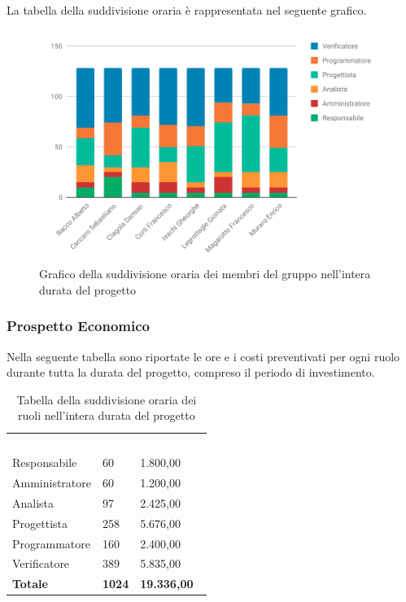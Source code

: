 La tabella della suddivisione oraria è rappresentata nel seguente grafico.
\begin{figure}[H]
\centering
	\includegraphics[width=.9\linewidth]{Preventivo/grafici/TI1.pdf}
	\caption{Grafico della suddivisione oraria dei membri del gruppo nell'intera durata del progetto}
\end{figure}

\subsubsection{Prospetto Economico}
Nella seguente tabella sono riportate le ore e i costi preventivati per ogni ruolo durante tutta la durata del progetto, compreso il periodo di investimento.


\begin{table}[H]	
	\begin{center}
	    \begin{tabular}{C{4cm}C{1cm}C{3,5cm}}
			\textcolor{white}{\textbf{Ruolo}} & \textcolor{white}{\textbf{Ore}} & \textcolor{white}{\textbf{Costo in €}}
			\\
			Responsabile & 60 & 1.800,00 \\
			Amministratore & 60 & 1.200,00 \\
			Analista & 97 & 2.425,00 \\
			Progettista & 258 & 5.676,00 \\
			Programmatore & 160 & 2.400,00 \\
			Verificatore & 389 & 5.835,00 \\
			\textbf{Totale} & \textbf{1024} & \textbf{19.336,00} \\

		\end{tabular}
	    \caption{Tabella della suddivisione oraria dei ruoli nell'intera durata del progetto} \label{tab:tabellaRuoliProgInt} 
	\end{center}
\end{table}


